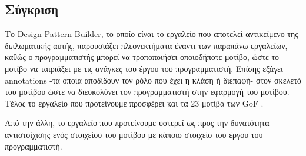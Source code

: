 \subsection{Σύγκριση}
\label{subsec:compare}
Το Design Pattern Builder, το οποίο είναι το εργαλείο που αποτελεί αντικείμενο 
της διπλωματικής αυτής, παρουσιάζει πλεονεκτήματα έναντι των παραπάνω εργαλείων,
καθώς ο προγραμματιστής μπορεί να τροποποιήσει οποιοδήποτε μοτίβο, 
ώστε το μοτίβο να ταιριάξει με τις ανάγκες του έργου του προγραμματιστή. 
Επίσης εξάγει annotations -τα οποία αποδίδουν τον ρόλο που έχει η κλάση ή διεπαφή-  
στον σκελετό του μοτίβου ώστε να διευκολύνει τον προγραμματιστή 
στην εφαρμογή του μοτίβου. 
Τέλος το εργαλείο που προτείνουμε προσφέρει και τα 23 μοτίβα των GoF \cite{GoF}.
\par
Από την άλλη, το εργαλείο που προτείνουμε υστερεί ως προς την δυνατότητα 
αντιστοίχισης ενός στοιχείου του μοτίβου με κάποιο στοιχείο 
του έργου του προγραμματιστή. 
